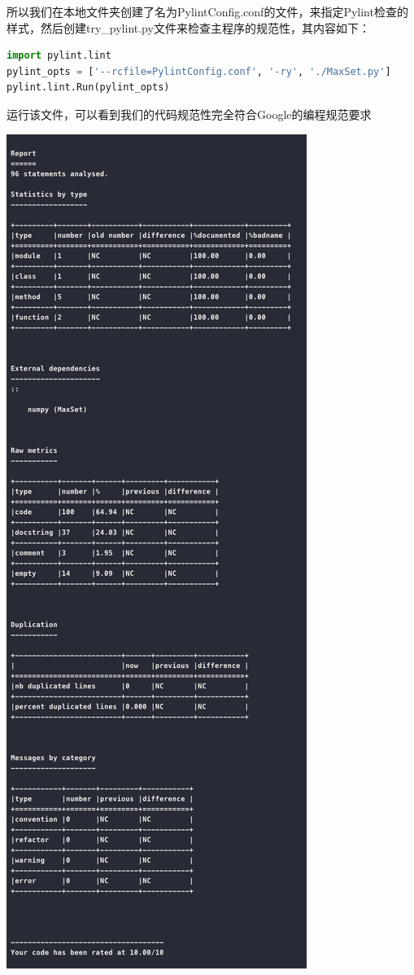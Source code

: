 \documentclass{article}
\begin{document}
\large
\newpage
所以我们在本地文件夹创建了名为PylintConfig.conf的文件，来指定Pylint检查的样式，然后创建try\_pylint.py文件来检查主程序的规范性，其内容如下：
\begin{lstlisting}[language = python]
import pylint.lint
pylint_opts = ['--rcfile=PylintConfig.conf', '-ry', './MaxSet.py']
pylint.lint.Run(pylint_opts)
\end{lstlisting}
\newpage
运行该文件，可以看到我们的代码规范性完全符合Google的编程规范要求
\begin{center}
   \includegraphics[scale = 0.65]{11.png}
\end{center}
\end{document}
